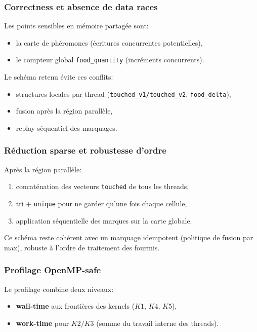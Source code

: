 \subsubsection{Correctness et absence de data races}

Les points sensibles en mémoire partagée sont:
\begin{itemize}[leftmargin=*]
  \item la carte de phéromones (écritures concurrentes potentielles),
  \item le compteur global \texttt{food\_quantity} (incréments concurrents).
\end{itemize}

Le schéma retenu évite ces conflits:
\begin{itemize}[leftmargin=*]
  \item structures locales par thread (\texttt{touched\_v1/touched\_v2}, \texttt{food\_delta}),
  \item fusion après la région parallèle,
  \item replay séquentiel des marquages.
\end{itemize}

\subsubsection{Réduction sparse et robustesse d'ordre}

Après la région parallèle:
\begin{enumerate}[leftmargin=*]
  \item concaténation des vecteurs \texttt{touched} de tous les threads,
  \item tri + \texttt{unique} pour ne garder qu'une fois chaque cellule,
  \item application séquentielle des marques sur la carte globale.
\end{enumerate}

Ce schéma reste cohérent avec un marquage idempotent (politique de fusion par max),
robuste à l'ordre de traitement des fourmis.

\subsubsection{Profilage OpenMP-safe}

Le profilage combine deux niveaux:
\begin{itemize}[leftmargin=*]
  \item \textbf{wall-time} aux frontières des kernels (\(K1\), \(K4\), \(K5\)),
  \item \textbf{work-time} pour \(K2/K3\) (somme du travail interne des threads).
\end{itemize}

